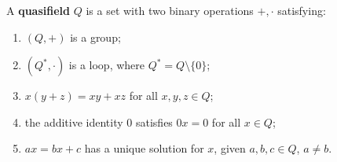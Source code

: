 A \textbf{quasifield} $Q$ is a set with two binary operations $+, \cdot$ satisfying:
\begin{enumerate}
\item $(Q, +)$ is a group;
\item $(Q^*, \cdot)$ is a loop, where $Q^* = Q \setminus \{0\}$;
\item $x(y+z) = xy+xz$ for all $x, y, z \in Q$;
\item the additive identity $0$ satisfies $0x=0$ for all $x \in Q$;
\item $ax=bx+c$ has a unique solution for $x$, given $a, b, c \in Q$, $a \neq b$.
\end{enumerate}
